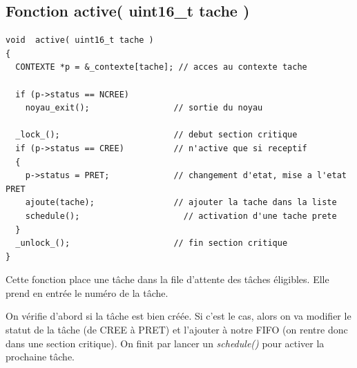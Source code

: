 \documentclass[a4paper,12pt]{report}
\begin{document}
\subsection{Fonction active( uint16\_t tache )}
\begin{lstlisting}
void  active( uint16_t tache )
{
  CONTEXTE *p = &_contexte[tache]; // acces au contexte tache

  if (p->status == NCREE)
    noyau_exit();                 // sortie du noyau 

  _lock_();                       // debut section critique 
  if (p->status == CREE)          // n'active que si receptif 
  {
    p->status = PRET;             // changement d'etat, mise a l'etat PRET 
    ajoute(tache);                // ajouter la tache dans la liste 
    schedule();                		// activation d'une tache prete 
  }
  _unlock_();                     // fin section critique 
}
\end{lstlisting}
Cette fonction place une tâche dans la file d'attente des tâches éligibles.  Elle prend en entrée le numéro de la tâche.

On vérifie d'abord si la tâche est bien créée. Si c'est le cas, alors on va modifier le statut de la tâche (de CREE à PRET) et l'ajouter à notre FIFO (on rentre donc dans une section critique). On finit par lancer un \textit{schedule()} pour activer la prochaine tâche.
\end{document}
